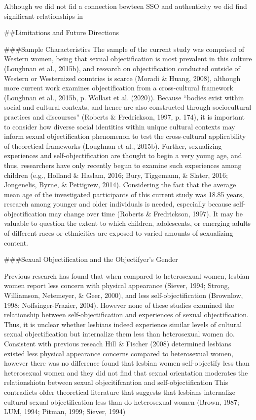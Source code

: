 \documentclass[
  man]{apa6}
\begin{document}
Although we did not fid a connection bewteen SSO and authenticity we did find significant relationships in

\#\#Limitations and Future Directions

\#\#\#Sample Characteristics
The sample of the current study was comprised of Western women, being that sexual objectification is most prevalent in this culture (Loughnan et al., 2015b), and research on objectification conducted outside of Western or Westernized countries is scarce (Moradi \& Huang, 2008), although more current work examines objectification from a cross-cultural framework (Loughnan et al., 2015b, p. Wollast et al. (2020)). Because \enquote{bodies exist within social and cultural contexts, and hence are also constructed through sociocultural practices and discourses} (Roberts \& Fredrickson, 1997, p. 174), it is important to consider how diverse social identities within unique cultural contexts may inform sexual objectification phenomenon to test the cross-cultural applicability of theoretical frameworks (Loughnan et al., 2015b). Further, sexualizing experiences and self-objectification are thought to begin a very young age, and thus, researchers have only recently begun to examine such experiences among children (e.g., Holland \& Haslam, 2016; Bury, Tiggemann, \& Slater, 2016; Jongenelis, Byrne, \& Pettigrew, 2014). Considering the fact that the average mean age of the investigated participants of this current study was 18.85 years, research among younger and older individuals is needed, especially because self-objectification may change over time (Roberts \& Fredrickson, 1997). It may be valuable to question the extent to which children, adolescents, or emerging adults of different races or ethnicities are exposed to varied amounts of sexualizing content.

\#\#\#Sexual Objectification and the Objectifyer's Gender

Previous research has found that when compared to heterosexual women, lesbian women report less concern with physical appearance (Siever, 1994; Strong, Williamson, Netemeyer, \& Geer, 2000), and less self-objectification (Brownlow, 1998; Noffsinger-Frazier, 2004). However none of these studies examined the relationship between self-objectification and experiences of sexual objectification. Thus, it is unclear whether lesbians indeed experience similar levels of cultural sexual objectification but internalize them less than heterosexual women do. Consistent with previous reseach Hill \& Fischer (2008) determined lesbians existed less physical appearance concerns compared to heterosexual women, however there was no difference found that lesbian women self-objectify less than heterosexual women and they did not find that sexual orientation moderates the relationshiotn between sexual objecitifcantion and self-objectification This contradicts older theoretical literature that suggests that lesbians internalize cultural sexual objectification less than do heterosexual women (Brown, 1987; LUM, 1994; Pitman, 1999; Siever, 1994)
\end{document}
